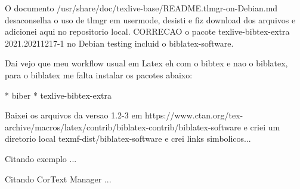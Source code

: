\documentclass{article}
\begin{document}

O documento /usr/share/doc/texlive-base/README.tlmgr-on-Debian.md desaconselha o uso de tlmgr em usermode, desisti e fiz download
dos arquivos e adicionei aqui no repositorio local. CORRECAO o pacote texlive-bibtex-extra 2021.20211217-1 no Debian testing incluid o biblatex-software.

Dai vejo que meu workflow usual em Latex eh com o bibtex e nao o biblatex, para o biblatex me falta instalar os pacotes abaixo:

* biber
* texlive-bibtex-extra

Baixei os arquivos da versao 1.2-3 em https://www.ctan.org/tex-archive/macros/latex/contrib/biblatex-contrib/biblatex-software
e criei um diretorio local texmf-dist/biblatex-software e crei links simbolicos...


Citando exemplo \cite{delebecque:hal-02090402} ...

Citando CorText Manager \cite{cortext_manager_v2} ...

\printbibliography
\end{document}

